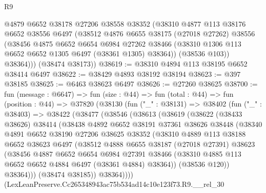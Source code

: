 \begin{lexlean}{R9}
\begin{coremodule}
          @4879
          @6652
          @38178
          @27206
          @38558
          @38352
          (@38310
            @4877
            @113
            @38176
            @6652
            @38556
            @6497
            (@38512
              @4876
              @6655
              @38175
              (@27018 @27262)
              @38556
              (@38456
                @4875
                @6652
                @6654
                @6984
                @27262
                @38466
                (@38310 @1306 @113 @6652 @6652 @1305 @6497 (@38361 @1305) @38364))
              (@38536 @103))
            @38364)))
      (@38474 @38173))
@38619 := @38310 @4894 @113 @38195 @6652 @38414 @6497
@38622 := @38429 @4893 @38192 @38194
@38623 := @397 @38185
@38625 := @6463 @38623 @6497
@38626 := @27260 @38625
@38700 := fun (message : @6647) =>
  fun (size : @44) =>
  fun (total : @44) =>
  fun (position : @44) =>
  @37820
    (@38130
      (fun ("_" : @38131) =>
      @38402
        (fun ("_" : @38403) =>
        @38422
          (@38477
            (@38546
              (@38613
                (@38619
                  (@38622
                    (@38433 @38626)
                    @38414
                    (@38438
                      @4892
                      @6652
                      @38191
                      @37361
                      @38626
                      @38448
                      (@38340
                        @4891
                        @6652
                        @38190
                        @27206
                        @38625
                        @38352
                        (@38310
                          @4889
                          @113
                          @38188
                          @6652
                          @38623
                          @6497
                          (@38512
                            @4888
                            @6655
                            @38187
                            (@27018 @27391)
                            @38623
                            (@38456
                              @4887
                              @6652
                              @6654
                              @6984
                              @27391
                              @38466
                              (@38310 @4885 @113 @6652 @6652 @4884 @6497 (@38361 @4884) @38364))
                            (@38536 @120))
                          @38364)))
                    (@38474 @38185))
                  @38364))))
          (LexLeanPreserve.Cc265348943ac75b534ad14c10e123f73.R9.__rel_30

\end{coremodule}
\end{lexlean}
